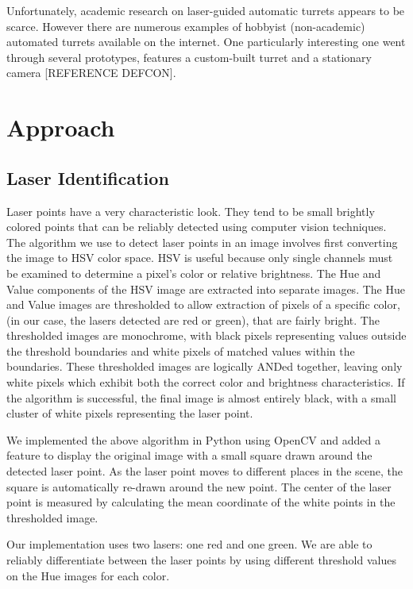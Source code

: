 \documentclass[10pt,twocolumn,letterpaper]{article}
\begin{document}
Unfortunately, academic research on laser-guided automatic turrets appears to be scarce.  However there are numerous examples of hobbyist (non-academic) automated turrets available on the internet.  One particularly interesting one went through several prototypes, features a custom-built turret and a stationary camera [REFERENCE DEFCON].

\section{Approach}

\subsection{Laser Identification}

Laser points have a very characteristic look. They tend to be small brightly colored points that can be reliably detected using computer vision techniques. The algorithm we use to detect laser points in an image involves first converting the image to HSV color space. HSV is useful because only single channels must be examined to determine a pixel's color or relative brightness. The Hue and Value components of the HSV image are extracted into separate images. The Hue and Value images are thresholded to allow extraction of pixels of a specific color, (in our case, the lasers detected are red or green), that are fairly bright.  The thresholded images are monochrome, with black pixels representing values outside the threshold boundaries and white pixels of matched values within the boundaries.  These thresholded images are logically ANDed together, leaving only white pixels which exhibit both the correct color and brightness characteristics.  If the algorithm is successful, the final image is almost entirely black, with a small cluster of white pixels representing the laser point.

We implemented the above algorithm in Python using OpenCV and added a feature to display the original image with a small square drawn around the detected laser point.  As the laser point moves to different places in the scene, the square is automatically re-drawn around the new point.  The center of the laser point is measured by calculating the mean coordinate of the white points in the thresholded image.

Our implementation uses two lasers: one red and one green.  We are able to reliably differentiate between the laser points by using different threshold values on the Hue images for each color.
\end{document}
